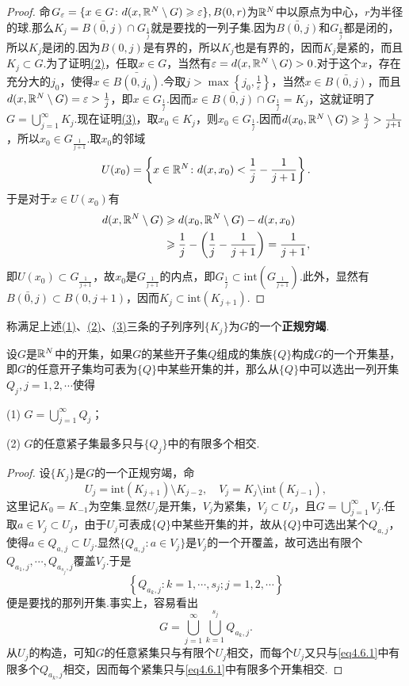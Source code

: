 \begin{proof}
	命$G_\varepsilon=\{x\in G\colon d(x,\mathbb R^N\setminus G)\geqslant\varepsilon\},B(0,r)$为$\mathbb R^N$中以原点为中心，$r$为半径的球.那么$K_j=\bar{B(0,j)}\cap G_{\frac1j}$就是要找的一列子集.因为$\bar{B(0,j)}$和$G_{\frac1j}$都是闭的，所以$K_j$是闭的.因为$B(0,j)$是有界的，所以$K_j$也是有界的，因而$K_j$是紧的，而且$K_j\subset G$.为了证明\hyperlink{4.6.4}{(2)}，任取$x\in G$，当然有$\varepsilon=d(x,\mathbb R^N\setminus G)>0$.对于这个$x$，存在充分大的$j_0$，使得$x\in\bar{B(0,j_0)}$.今取$j>\max\left\{j_0,\frac1{\varepsilon}\right\}$，当然$x\in\bar{B(0,j)}$，而且$d(x,\mathbb R^N\setminus G)=\varepsilon>\frac1j$，即$x\in G_{\frac1j}$.因而$x\in\bar{B(0,j)}\cap G_{\frac1j}=K_j$，这就证明了$G=\bigcup\limits_{j=1}^\infty K_j$.现在证明\hyperlink{4.6.4}{(3)}，取$x_0\in K_j$，则$x_0\in G_{\frac1j}$.因而$d(x_0,\mathbb R^N\setminus G)\geqslant\frac1j>\frac1{j+1}$，所以$x_0\in G_{\frac1{j+1}}$.取$x_0$的邻域
	\[U(x_0)=\left\{x\in\mathbb R^N\colon d(x,x_0)<\frac1j-\frac1{j+1}\right\}.\]
	于是对于$x\in U(x_0)$有
	\begin{align*}
		d(x,\mathbb R^N\setminus G)
		&\geqslant d(x_0,\mathbb R^N\setminus G)-d(x,x_0)\\
		&\geqslant \frac1j-\left(\frac1j-\frac1{j+1}\right)=\frac1{j+1},
	\end{align*}
即$U(x_0)\subset G_{\frac1{j+1}}$，故$x_0$是$G_{\frac1{j+1}}$的内点，即$G_{\frac1j}\subset \mathrm{int}\left(G_{\frac1{j+1}}\right)$.此外，显然有$\bar{B(0,j)}\subset B(0,j+1)$，因而$K_j\subset\mathrm{int}(K_{j+1})$.
\end{proof}
称满足上述\hyperlink{4.6.4}{(1)}、\hyperlink{4.6.4}{(2)}、\hyperlink{4.6.4}{(3)}三条的子列序列$\{K_j\}$为$G$的一个\textbf{正规穷竭}.
\begin{lemma}\label{lem4.6.5}
	设$G$是$\mathbb R^N$中的开集，如果$G$的某些开子集$Q$组成的集族$\{Q\}$构成$G$的一个开集基，即$G$的任意开子集均可表为$\{Q\}$中某些开集的并，那么从$\{Q\}$中可以选出一列开集$Q_j,j=1,2,\cdots$使得
	
	(1)\hypertarget{4.6.5}{}
	$G=\bigcup\limits_{j=1}^\infty Q_j$；
	
	(2)\hypertarget{4.6.5}{}
	$G$的任意紧子集最多只与$\{Q_j\}$中的有限多个相交.
\end{lemma}
\begin{proof}
	设$\{K_j\}$是$G$的一个正规穷竭，命
	\[U_j=\mathrm{int}(K_{j+1})\setminus K_{j-2},\quad V_j=K_j\setminus\mathrm{int}(K_{j-1}),\]
	这里记$K_0=K_{-1}$为空集.显然$U_j$是开集，$V_j$为紧集，$V_j\subset U_j$，且$G=\bigcup\limits_{j=1}^\infty V_j$.任取$a\in V_j\subset U_j$，由于$U_j$可表成$\{Q\}$中某些开集的并，故从$\{Q\}$中可选出某个$Q_{a,j}$，使得$a\in Q_{a,j}\subset U_j$.显然$\{Q_{a,j}\colon a\in V_j\}$是$V_j$的一个开覆盖，故可选出有限个$Q_{a_1,j},\cdots,Q_{a_{s_j},j}$覆盖$V_j$.于是
	\begin{equation}\label{eq4.6.1}
		\left\{Q_{a_k,j}\colon k=1,\cdots,s_j;j=1,2,\cdots\right\}
	\end{equation}
便是要找的那列开集.事实上，容易看出
\[G=\bigcup_{j=1}^\infty \bigcup_{k=1}^{s_j} Q_{a_k,j}.\]
从$U_j$的构造，可知$G$的任意紧集只与有限个$U_j$相交，而每个$U_j$又只与\eqref{eq4.6.1}中有限多个$Q_{a_k,j}$相交，因而每个紧集只与\eqref{eq4.6.1}中有限多个开集相交.
\end{proof}
